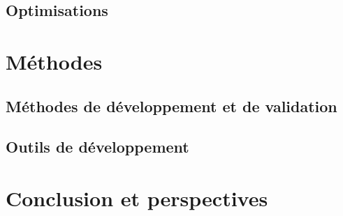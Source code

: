\documentclass[11pt]{beamer}
\begin{document}
\begin{frame}
  \frametitle{}
  \framesubtitle{}
\end{frame}


\subsection{Optimisations}

\section{Méthodes}

\subsection{Méthodes de développement et de validation}

\begin{frame}
  \frametitle{}
  \framesubtitle{}
\end{frame}


\subsection{Outils de développement}

\begin{frame}
  \frametitle{}
  \framesubtitle{}
\end{frame}


\section{Conclusion et perspectives}

\begin{frame}
  \frametitle{}
  \framesubtitle{}
\end{frame}
\end{document}
